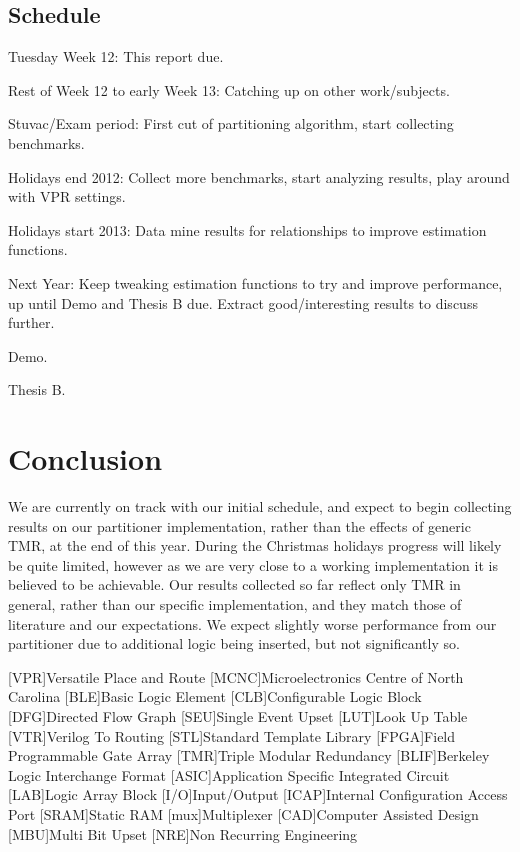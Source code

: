 \documentclass[12pt,drafta4paper,oneside]{memoir} %
\begin{document}
\section{Schedule}
Tuesday Week 12: This report due.

Rest of Week 12 to early Week 13: Catching up on other work/subjects.

Stuvac/Exam period: First cut of partitioning algorithm, start collecting benchmarks.

Holidays end 2012: Collect more benchmarks, start analyzing results, play around with \ac{VPR} settings.

Holidays start 2013: Data mine results for relationships to improve estimation functions.

Next Year: Keep tweaking estimation functions to try and improve performance, up until Demo and Thesis B due. Extract good/interesting results to discuss further.

Demo.

Thesis B.
\chapter{Conclusion}
We are currently on track with our initial schedule, and expect to begin collecting results on our partitioner implementation, rather than the effects of generic \ac{TMR}, at the end of this year. During the Christmas holidays progress will likely be quite limited, however as we are very close to a working implementation it is believed to be achievable.
Our results collected so far reflect only \ac{TMR} in general, rather than our specific implementation, and they match those of literature and our expectations. We expect slightly worse performance from our partitioner due to additional logic being inserted, but not significantly so.

\begin{acronym}
[VPR]{Versatile Place and Route}
[MCNC]{Microelectronics Centre of North Carolina}
[BLE]{Basic Logic Element}
[CLB]{Configurable Logic Block}
[DFG]{Directed Flow Graph}
[SEU]{Single Event Upset}
[LUT]{Look Up Table}
[VTR]{Verilog To Routing}
[STL]{Standard Template Library}
[FPGA]{Field Programmable Gate Array}
[TMR]{Triple Modular Redundancy}
[BLIF]{Berkeley Logic Interchange Format}
[ASIC]{Application Specific Integrated Circuit}
[LAB]{Logic Array Block}
[I/O]{Input/Output}
[ICAP]{Internal Configuration Access Port}
[SRAM]{Static RAM}
[mux]{Multiplexer}
[CAD]{Computer Assisted Design}
[MBU]{Multi Bit Upset}
[NRE]{Non Recurring Engineering}
\end{acronym}



\end{document}
